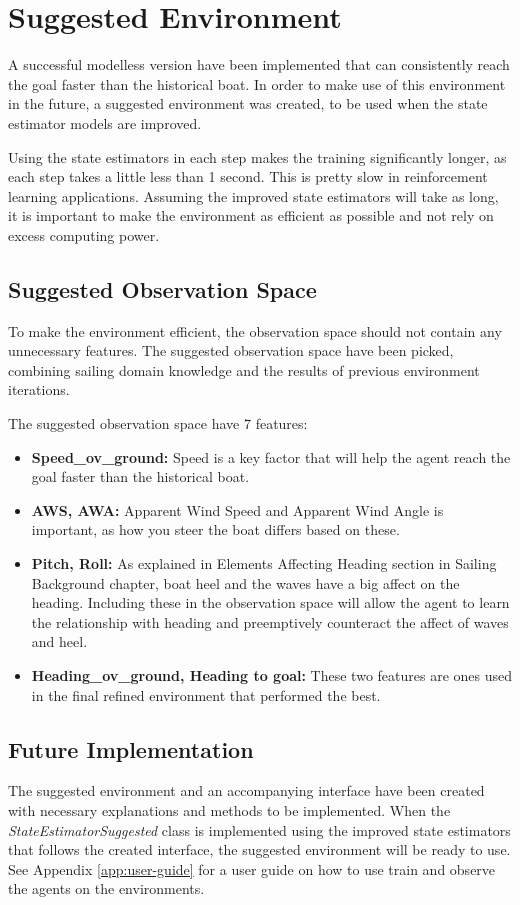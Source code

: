 \documentclass[12pt,twoside]{report}
\begin{document}
\section{Suggested Environment}
A successful modelless version have been implemented that can consistently reach the goal faster than the historical boat. In order to make use of this environment in the future, a suggested environment was created, to be used when the state estimator models are improved.

Using the state estimators in each step makes the training significantly longer, as each step takes a little less than 1 second. This is pretty slow in reinforcement learning applications. Assuming the improved state estimators will take as long, it is important to make the environment as efficient as possible and not rely on excess computing power.

\subsection{Suggested Observation Space}
To make the environment efficient, the observation space should not contain any unnecessary features. The suggested observation space have been picked, combining sailing domain knowledge and the results of previous environment iterations.

The suggested observation space have 7 features:
\begin{itemize}
    \item \textbf{Speed\_ov\_ground:} Speed is a key factor that will help the agent reach the goal faster than the historical boat.
    \item \textbf{AWS, AWA:} Apparent Wind Speed and Apparent Wind Angle is important, as how you steer the boat differs based on these.
    \item \textbf{Pitch, Roll:} As explained in Elements Affecting Heading section in Sailing Background chapter, boat heel and the waves have a big affect on the heading. Including these in the observation space will allow the agent to learn the relationship with heading and preemptively counteract the affect of waves and heel.
    \item \textbf{Heading\_ov\_ground, Heading to goal:} These two features are ones used in the final refined environment that performed the best.
\end{itemize}

\subsection{Future Implementation}
The suggested environment and an accompanying interface have been created with necessary explanations and methods to be implemented. When the \textit{StateEstimatorSuggested} class is implemented using the improved state estimators that follows the created interface, the suggested environment will be ready to use. See Appendix \ref{app:user-guide} for a user guide on how to use train and observe the agents on the environments.
\end{document}
